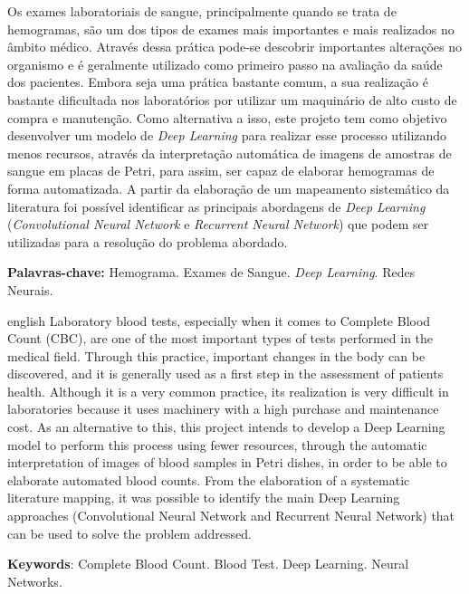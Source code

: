 \documentclass[
	10pt,			 	  %
	oneside,
	a4paper,			  %
	chapter=TITLE,		  %
	english,			 %
	brazil				 %
	]{abntex2}
\begin{document}
\setlength{\absparsep}{18pt} %
\begin{resumo}
	Os exames laboratoriais de sangue, principalmente quando se trata de hemogramas, são um dos tipos de exames mais importantes e mais realizados no âmbito médico. Através dessa prática pode-se descobrir importantes alterações no organismo e é geralmente utilizado como primeiro passo na avaliação da saúde dos pacientes. Embora seja uma prática bastante comum, a sua realização é bastante dificultada nos laboratórios por utilizar um maquinário de alto custo de compra e manutenção. Como alternativa a isso, este projeto tem como objetivo desenvolver um modelo de \emph{Deep Learning} para realizar esse processo utilizando menos recursos, através da interpretação automática de imagens de amostras de sangue em placas de Petri, para assim, ser capaz de elaborar hemogramas de forma automatizada. A partir da elaboração de um mapeamento sistemático da literatura foi possível identificar as principais abordagens de \emph{Deep Learning} (\emph{Convolutional Neural Network} e \emph{Recurrent Neural Network}) que podem ser utilizadas para a resolução do problema abordado.
	
	\textbf{Palavras-chave:} Hemograma. Exames de Sangue. \emph{Deep Learning}. Redes Neurais.
\end{resumo}

\begin{resumo}[Abstract]
	\begin{otherlanguage*}{english}
		Laboratory blood tests, especially when it comes to Complete Blood Count (CBC), are one of the most important types of tests performed in the medical field. Through this practice, important changes in the body can be discovered, and it is generally used as a first step in the assessment of patients health. Although it is a very common practice, its realization is very difficult in laboratories because it uses machinery with a high purchase and maintenance cost. As an alternative to this, this project intends to develop a Deep Learning model to perform this process using fewer resources, through the automatic interpretation of images of blood samples in Petri dishes, in order to be able to elaborate automated blood counts. From the elaboration of a systematic literature mapping, it was possible to identify the main Deep Learning approaches (Convolutional Neural Network and Recurrent Neural Network) that can be used to solve the problem addressed.
		\vspace{\onelineskip}
		\noindent 
		
		\textbf{Keywords}: Complete Blood Count. Blood Test. Deep Learning. Neural Networks.
	\end{otherlanguage*}
\end{resumo}
\end{document}
